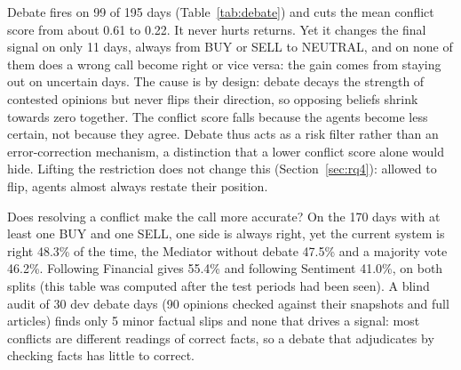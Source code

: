 \documentclass[11pt]{article}
\begin{document}
\begin{table}[t]
\centering
\small
\setlength{\tabcolsep}{3pt}
\caption{Debate statistics and final signal distribution of our full system.}
\label{tab:debate}
\end{table}

Debate fires on 99 of 195 days (Table~\ref{tab:debate}) and cuts the mean conflict score from about 0.61 to 0.22. It
never hurts returns. Yet it changes the final signal on only 11 days, always from BUY or SELL to NEUTRAL, and on none of
them does a wrong call become right or vice versa: the gain comes from staying out on uncertain days. The cause is by
design: debate decays the strength of contested opinions but never flips their direction, so opposing beliefs shrink
towards zero together. The conflict score falls because the agents become less certain, not because they agree.
Debate thus acts as a risk filter rather than an error-correction mechanism, a distinction that a lower conflict score
alone would hide. Lifting the restriction does not change this (Section~\ref{sec:rq4}): allowed to flip, agents almost
always restate their position.

Does resolving a conflict make the call more accurate? On the 170 days with at least one BUY and one SELL, one side is
always right, yet the current system is right 48.3\% of the time, the Mediator without debate 47.5\% and a majority vote
46.2\%. Following Financial gives 55.4\% and following Sentiment 41.0\%, on both splits (this table was computed after
the test periods had been seen). A blind audit of 30 dev debate days (90 opinions checked against their snapshots and
full articles) finds only 5 minor factual slips and none that drives a signal: most conflicts are different readings of
correct facts, so a debate that adjudicates by checking facts has little to correct.
\end{document}
